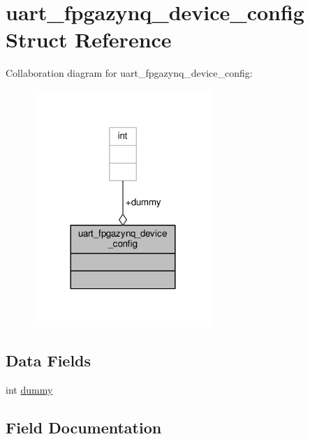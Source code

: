 \hypertarget{structuart__fpgazynq__device__config}{}\section{uart\+\_\+fpgazynq\+\_\+device\+\_\+config Struct Reference}
\label{structuart__fpgazynq__device__config}


Collaboration diagram for uart\+\_\+fpgazynq\+\_\+device\+\_\+config\+:\nopagebreak
\begin{figure}[H]
\begin{center}
\leavevmode
\includegraphics[width=192pt]{structuart__fpgazynq__device__config__coll__graph}
\end{center}
\end{figure}
\subsection*{Data Fields}
\begin{DoxyCompactItemize}
\item 
int \hyperlink{structuart__fpgazynq__device__config_a7c1d654b7b6114d7a0abc8d351dd1bcd}{dummy}
\end{DoxyCompactItemize}


\subsection{Field Documentation}

